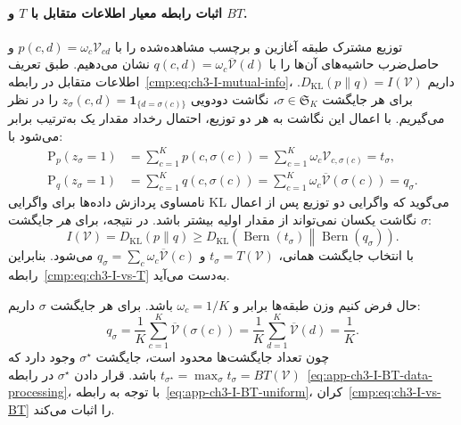 \paragraph{اثبات رابطه معیار اطلاعات متقابل با $T$ و $BT$.}
توزیع مشترک طبقه آغازین و برچسب مشاهده‌شده را با
$p(c,d)=\omega_c\mathcal V_{cd}$ و حاصل‌ضرب حاشیه‌های آن‌ها را با
$q(c,d)=\omega_c\overline{\mathcal V}(d)$ نشان می‌دهیم. طبق تعریف اطلاعات متقابل در رابطه~\eqref{cmp:eq:ch3-I-mutual-info}، داریم $D_{\mathrm{KL}}(p\|q)=I(\mathcal V)$. برای هر جایگشت $\sigma\in \mathfrak{S}_K$، نگاشت دودویی
$z_\sigma(c,d)=\mathbf 1_{\{d=\sigma(c)\}}$ را در نظر می‌گیریم. با اعمال این نگاشت به هر دو توزیع، احتمال رخداد مقدار یک به‌ترتیب برابر می‌شود با:
\begin{equation}\label{eq:app-ch3-I-BT-Bernoulli-params}
\begin{aligned}
\mathrm P_p(z_\sigma=1)
&=\sum_{c=1}^{K}p(c,\sigma(c))
=\sum_{c=1}^{K}\omega_c\mathcal V_{c,\sigma(c)}
=t_\sigma,\\
\mathrm P_q(z_\sigma=1)
&=\sum_{c=1}^{K}q(c,\sigma(c))
=\sum_{c=1}^{K}\omega_c\overline{\mathcal V}(\sigma(c))
=q_\sigma.
\end{aligned}
\end{equation}
نامساوی پردازش داده‌ها برای واگرایی KL می‌گوید که واگرایی دو توزیع پس از اعمال نگاشت یکسان نمی‌تواند از مقدار اولیه بیشتر باشد. در نتیجه، برای \emph{هر} جایگشت $\sigma$:
\begin{equation}\label{eq:app-ch3-I-BT-data-processing}
I(\mathcal V)=D_{\mathrm{KL}}(p\|q)
\ge D_{\mathrm{KL}}\!\left(
\operatorname{Bern}(t_\sigma)\middle\|
\operatorname{Bern}(q_\sigma)\right).
\end{equation}
با انتخاب جایگشت همانی، $t_\sigma=T(\mathcal V)$ و
$q_\sigma=\sum_c\omega_c\overline{\mathcal V}(c)$ می‌شود. بنابراین رابطه~\eqref{cmp:eq:ch3-I-vs-T} به‌دست می‌آید.

حال فرض کنیم وزن طبقه‌ها برابر و $\omega_c=1/K$ باشد. برای هر جایگشت $\sigma$ داریم:
\begin{equation}\label{eq:app-ch3-I-BT-uniform}
q_\sigma=\frac1K\sum_{c=1}^{K}\overline{\mathcal V}(\sigma(c))
=\frac1K\sum_{d=1}^{K}\overline{\mathcal V}(d)
=\frac1K.
\end{equation}
چون تعداد جایگشت‌ها محدود است، جایگشت $\sigma^\star$ وجود دارد که
$t_{\sigma^\star}=\max_\sigma t_\sigma=BT(\mathcal V)$ باشد.
قرار دادن $\sigma^\star$ در رابطه~\eqref{eq:app-ch3-I-BT-data-processing}، با توجه به رابطه~\eqref{eq:app-ch3-I-BT-uniform}، کران~\eqref{cmp:eq:ch3-I-vs-BT} را اثبات می‌کند.

